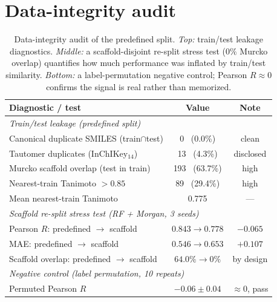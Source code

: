 \documentclass{article}
\begin{document}
\section{Data-integrity audit}
\begin{table}[h]
  \centering
  \caption{Data-integrity audit of the predefined split. \emph{Top:} train/test
  leakage diagnostics. \emph{Middle:} a scaffold-disjoint re-split stress test
  ($0\%$ Murcko overlap) quantifies how much performance was inflated by
  train/test similarity. \emph{Bottom:} a label-permutation negative control;
  Pearson $R \approx 0$ confirms the signal is real rather than memorized.}
  \label{tab:audit}
  \small
  \begin{tabular}{lcc}
    \toprule
    \textbf{Diagnostic / test} & \textbf{Value} & \textbf{Note} \\
    \midrule
    \multicolumn{3}{l}{\emph{Train/test leakage (predefined split)}} \\
    Canonical duplicate SMILES (train$\cap$test) & 0 \ (0.0\%)   & clean \\
    Tautomer duplicates (InChIKey$_{14}$)        & 13 \ (4.3\%)  & disclosed \\
    Murcko scaffold overlap (test in train)      & 193 \ (63.7\%)& high \\
    Nearest-train Tanimoto $> 0.85$              & 89 \ (29.4\%) & high \\
    Mean nearest-train Tanimoto                  & 0.775         & --- \\
    \midrule
    \multicolumn{3}{l}{\emph{Scaffold re-split stress test (RF + Morgan, 3 seeds)}} \\
    Pearson $R$: predefined $\rightarrow$ scaffold & $0.843 \rightarrow 0.778$ & $-0.065$ \\
    MAE: predefined $\rightarrow$ scaffold         & $0.546 \rightarrow 0.653$ & $+0.107$ \\
    Scaffold overlap: predefined $\rightarrow$ scaffold & $64.0\% \rightarrow 0\%$ & by design \\
    \midrule
    \multicolumn{3}{l}{\emph{Negative control (label permutation, 10 repeats)}} \\
    Permuted Pearson $R$                          & $-0.06 \pm 0.04$ & $\approx 0$, pass \\
    \bottomrule
  \end{tabular}
\end{table}
\end{document}
